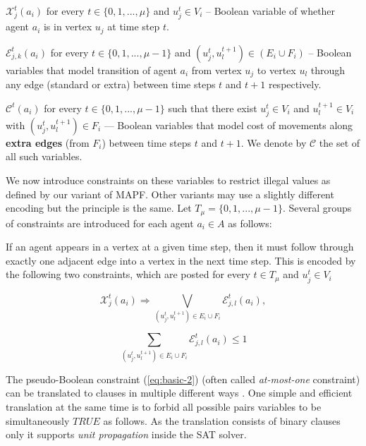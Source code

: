 \documentclass[jair,oneside,11pt]{article}
\begin{document}
  $\mathcal{X}^t_j(a_i)$ for every $t \in \{0,1,...,\mu \}$
and $u^t_j \in V_i$ -- Boolean variable of whether agent $a_i$ is in vertex $u_j$ at time step $t$.
\vspace{0.25cm}

 $\mathcal{E}^t_{j,k}(a_i)$ for every $t \in \{0,1,...,\mu-1
\}$ and $(u^t_j,u^{t+1}_l) \in (E_i \cup F_i)$ -- Boolean variables that model transition of agent $a_i$ from vertex $u_j$ to vertex $u_l$ through any edge (standard or extra) between time steps $t$ and $t+1$ respectively.
\vspace{0.25cm}

  $\mathcal{C}^t(a_i)$ for every $t \in \{0,1,...,\mu-1 \}$ such that there exist $u^t_j \in V_i$ and $u^{t+1}_l \in V_i$ with $(u^t_j,u^{t+1}_l) \in F_i$ --- Boolean variables that model cost of movements along {\bf extra edges} (from $F_i$) between time steps $t$ and $t + 1$. We denote by $\mathcal{C}$ the set of all such variables. 
\vspace{0.25cm}

We now introduce constraints on these variables to restrict illegal values as
defined by our variant of MAPF. Other variants may use a slightly different
encoding but the principle is the same. Let $T_\mu = \{0, 1, ..., \mu-1\}$.
Several groups of constraints are introduced for each agent $a_i \in A$ as
follows:
\vspace{0.25cm}

 If an agent appears in a vertex at a given time step, then it must follow through exactly one adjacent edge into a vertex in the next time step. This is encoded by the following two constraints, which are posted for every $t \in T_\mu$ and $u^t_j \in V_i$

\begin{equation}
   {  \mathcal{X}^t_j(a_i) \Rightarrow \bigvee_{(u^t_j,u^{t+1}_l) \in E_i \cup F_i }{\mathcal{E}^t_{j,l}(a_i),}
      }\label{eq:basic-start}
\end{equation}

\begin{equation}
   {  \sum_{(u^t_j,u^{t+1}_l) \in E_i \cup F_i }{\mathcal{E}^t_{j,l}(a_i)} \leq 1
      }
            \label{eq:basic-2}
\end{equation}
\vspace{0.25cm}

The pseudo-Boolean constraint (\ref{eq:basic-2}) (often called {\em at-most-one} constraint) can be translated to clauses in multiple different ways \cite{DBLP:conf/cp/AnsoteguiBCDEMN19}. One simple and efficient translation at the same time is to forbid all possible pairs variables to be simultaneously $\mathit{TRUE}$ as follows. As the translation consists of binary clauses only it supports {\em unit propagation} \cite{DBLP:journals/jlp/DowlingG84} inside the SAT solver.
\end{document}
